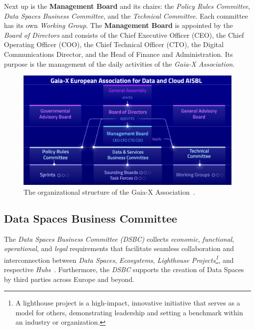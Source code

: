 Next up is the \textbf{Management Board} and its chairs: the \textit{Policy Rules Committee}, \textit{Data Spaces Business Committee}, and the \textit{Technical Committee}.
Each committee has its own \textit{Working Group}.
The \textbf{Management Board} is appointed by the \textit{Board of Directors} and consists of the Chief Executive Officer (CEO), the Chief Operating Officer (COO), the Chief Technical Officer (CTO), the Digital Communications Director, and the Head of Finance and Administration.
Its purpose is the management of the daily activities of the \textit{Gaia-X Association}.

\begin{figure}
    \centering
    \includegraphics[width=\textwidth]{figures/management-board-structure.png}
    \caption{The organizational structure of the Gaia-X Association~\cite{gaiax}.}\label{fig:organizational-board-structure}
\end{figure}

\subsection{Data Spaces Business Committee}\label{subsec:data-spaces-business-committee}

The \textit{Data Spaces Business Committee (DSBC)} collects \textit{economic}, \textit{functional}, \textit{operational}, and \textit{legal} requirements that facilitate seamless collaboration and interconnection between \textit{Data Spaces}, \textit{Ecosystems}, \textit{Lighthouse Projects\footnote{A lighthouse project is a high-impact, innovative initiative that serves as a model for others, demonstrating leadership and setting a benchmark within an industry or organization.}}, and respective \textit{Hubs}~\cite{gaiax}. %
Furthermore, the \textit{DSBC} supports the creation of Data Spaces by third parties across Europe and beyond.

